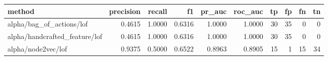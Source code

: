 \begin{tabular}{lrrrrrrrrr}
\hline
method & precision & recall & f1 & pr\_auc & roc\_auc & tp & fp & fn & tn \\
\hline
alpha/bag\_of\_actions/lof & 0.4615 & 1.0000 & 0.6316 & 1.0000 & 1.0000 & 30 & 35 & 0 & 0 \\
alpha/handcrafted\_feature/lof & 0.4615 & 1.0000 & 0.6316 & 1.0000 & 1.0000 & 30 & 35 & 0 & 0 \\
alpha/node2vec/lof & 0.9375 & 0.5000 & 0.6522 & 0.8963 & 0.8905 & 15 & 1 & 15 & 34 \\
\hline
\end{tabular}
